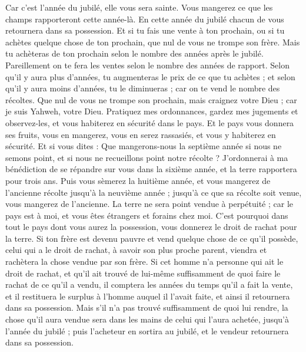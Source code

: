 \begin{multicols}{2}
Car c'est l'année du jubilé, elle vous sera sainte. Vous mangerez ce que les champs rapporteront cette année-là.
En cette année du jubilé chacun de vous retournera dans sa possession.
Et si tu fais une vente à ton prochain, ou si tu achètes quelque chose de ton prochain, que nul de vous ne trompe son frère.
Mais tu achèteras de ton prochain selon le nombre des années après le jubilé. Pareillement on te fera les ventes selon le nombre des années de rapport.
Selon qu'il y aura plus d'années, tu augmenteras le prix de ce que tu achètes ; et selon qu'il y aura moins d'années, tu le diminueras ; car on te vend le nombre des récoltes.
Que nul de vous ne trompe son prochain, mais craignez votre Dieu ; car je suis Yahweh, votre Dieu.
Pratiquez mes ordonnances, gardez mes jugements et observez-les, et vous habiterez en sécurité dans le pays.
Et le pays vous donnera ses fruits, vous en mangerez, vous en serez rassasiés, et vous y habiterez en sécurité.
Et si vous dites : Que mangerons-nous la septième année si nous ne semons point, et si nous ne recueillons point notre récolte ?
J'ordonnerai à ma bénédiction de se répandre sur vous dans la sixième année, et la terre rapportera pour trois ans.
Puis vous sèmerez la huitième année, et vous mangerez de l'ancienne récolte jusqu'à la neuvième année ; jusqu'à ce que sa récolte soit venue, vous mangerez de l'ancienne.
La terre ne sera point vendue à perpétuité ; car le pays est à moi, et vous êtes étrangers et forains chez moi.
C'est pourquoi dans tout le pays dont vous aurez la possession, vous donnerez le droit de rachat pour la terre.
Si ton frère est devenu pauvre et vend quelque chose de ce qu'il possède, celui qui a le droit de rachat, à savoir son plus proche parent, viendra et rachètera la chose vendue par son frère.
Si cet homme n'a personne qui ait le droit de rachat, et qu'il ait trouvé de lui-même suffisamment de quoi faire le rachat de ce qu'il a vendu,
il comptera les années du temps qu'il a fait la vente, et il restituera le surplus à l'homme auquel il l'avait faite, et ainsi il retournera dans sa possession.
Mais s'il n'a pas trouvé suffisamment de quoi lui rendre, la chose qu'il aura vendue sera dans les mains de celui qui l'aura achetée, jusqu'à l'année du jubilé ; puis l'acheteur en sortira au jubilé, et le vendeur retournera dans sa possession.

\end{multicols}
